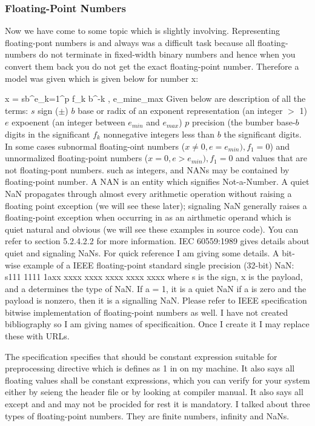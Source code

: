 \subsubsection{Floating-Point Numbers}
Now we have come to some topic which is slightly
involving. Representing floating-pont numbers is and always was a
difficult task because all floating-numbers do not terminate in
fixed-width binary numbers and hence when you convert them back you do
not get the exact floating-point number. Therefore a model was given
which is given below for number x:

\setupformulas[left={[},right={]},numberstyle=bold]
\placeformula
\startformula
x = sb^e\sum_{k=1}^p f_k b^{-k} , e_{min}\le e\ge_{max}
\stopformula
Given below are description of all the terms:\hfill\break
\indent $s$ sign ($\pm$)\hfill\break
\indent $b$ base or radix of an exponent representation (an integer $>$
1)\hfill\break
\indent $e$ expoenent (an integer between $e_{min}$ and $e_{max}$)\hfill\break
\indent $p$ precision (the bumber base-$b$ digits in the significant\hfill\break
\indent $f_k$ nonnegative integers less than $b$ the significant
digits.\hfill\break
In some cases subnormal floating-oint numbers ($x\ne0, e=e_{min}),
f_1=0$) and unnormalized floating-point numbers ($x=0, e\gt e_{min}),
f_1=0$ and values that are not floating-pont numbers. such as
integers, and NANs may be contained by floating-point number. A NAN is
an entity which signifies Not-a-Number. A quiet NaN propagates through
almost every arithmetic operation without raising a floating point
exception (we will see these later); signaling  NaN generally raises a
floating-point exception when occurring in as an airthmetic operand
which is quiet natural and obvious (we will see these examples in
source code). You can refer to section 5.2.4.2.2 for more information.
IEC 60559:1989 gives details about quiet and signaling NaNs. For quick
reference I am giving some details. A bit-wise example of a IEEE
floating-point standard single precision (32-bit) NaN: s111 1111 1axx
xxxx xxxx xxxx xxxx xxxx where s is the sign, x is the payload, and a
determines the type of NaN. If a = 1, it is a quiet NaN if a is zero
and the payload is nonzero, then it is a signalling NaN. Please refer
to IEEE specification bitwise implementation of floating-point numbers
as well. I have not created bibliography so I am giving names of
specificaition. Once I create it I may replace these with URLs.

The specification specifies that  should be constant
expression suitable for  preprocessing directive which is
defines as 1 in  on my machine. It also says all
floating values shall be constant expressions, which you can verify
for your system either by seieng the header file or by looking at
compiler manual. It also says all except  and  and  may not be procided for rest
it is mandatory. I talked about three types of floating-point
numbers. They are finite numbers, infinity and NaNs.

